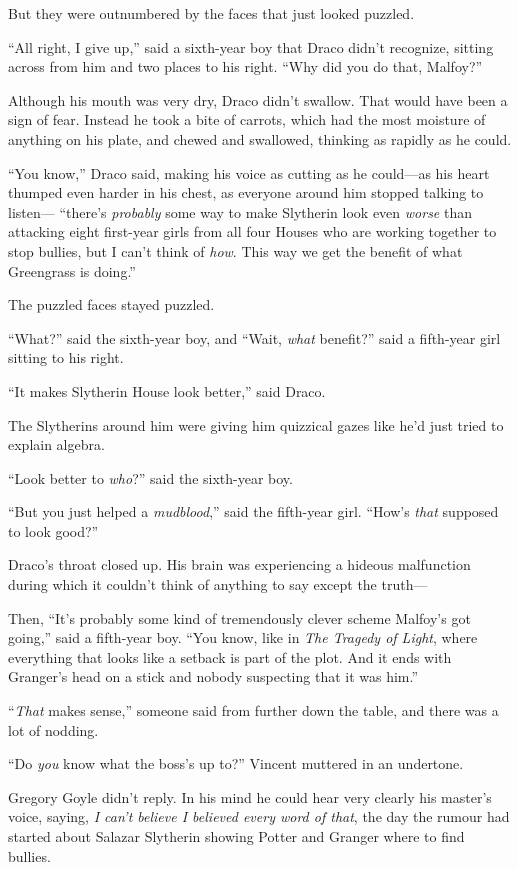 But they were outnumbered by the faces that just looked puzzled.

“All right, I give up,” said a sixth-year boy that Draco didn’t recognize, sitting across from him and two places to his right. “Why did you do that, Malfoy?”

Although his mouth was very dry, Draco didn’t swallow. That would have been a sign of fear. Instead he took a bite of carrots, which had the most moisture of anything on his plate, and chewed and swallowed, thinking as rapidly as he could.

“You know,” Draco said, making his voice as cutting as he could—as his heart thumped even harder in his chest, as everyone around him stopped talking to listen— “there’s \emph{probably} some way to make Slytherin look even \emph{worse} than attacking eight first-year girls from all four Houses who are working together to stop bullies, but I can’t think of \emph{how}. This way we get the benefit of what Greengrass is doing.”

The puzzled faces stayed puzzled.

“What?” said the sixth-year boy, and “Wait, \emph{what} benefit?” said a fifth-year girl sitting to his right.

“It makes Slytherin House look better,” said Draco.

The Slytherins around him were giving him quizzical gazes like he’d just tried to explain algebra.

“Look better to \emph{who}?” said the sixth-year boy.

“But you just helped a \emph{mudblood},” said the fifth-year girl. “How’s \emph{that} supposed to look good?”

Draco’s throat closed up. His brain was experiencing a hideous malfunction during which it couldn’t think of anything to say except the truth—

Then, “It’s probably some kind of tremendously clever scheme Malfoy’s got going,” said a fifth-year boy. “You know, like in \emph{The Tragedy of Light}, where everything that looks like a setback is part of the plot. And it ends with Granger’s head on a stick and nobody suspecting that it was him.”

“\emph{That} makes sense,” someone said from further down the table, and there was a lot of nodding.

\later

“Do \emph{you} know what the boss’s up to?” Vincent muttered in an undertone.

Gregory Goyle didn’t reply. In his mind he could hear very clearly his master’s voice, saying, \emph{I can’t believe I believed every word of that}, the day the rumour had started about Salazar Slytherin showing Potter and Granger where to find bullies.

